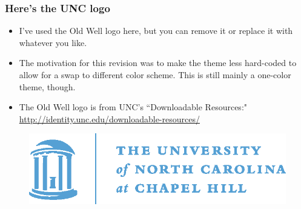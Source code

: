 \documentclass{beamer}
\begin{document}
\begin{frame}
\frametitle{Here's the UNC logo}

\begin{itemize}
\item I've used the Old Well logo here, but you 
can remove it or replace it with whatever you like.
\item The motivation for this revision was to 
make the theme less hard-coded to allow for a 
swap to different color scheme. This is still 
mainly a one-color theme, though.
\item The Old Well logo is from 
UNC's ``Downloadable Resources:"
{\color{blue!80} \url{http://identity.unc.edu/downloadable-resources/}}
\end{itemize}

\begin{figure}
\centering
\includegraphics[width=0.6\linewidth]{oldwell_cmyk}
\end{figure}
\end{frame}
%
\end{document}
